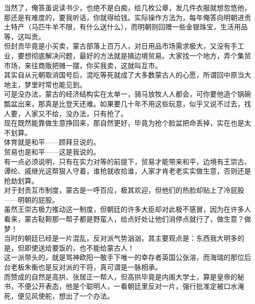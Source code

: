 \begin{multicols}{\theparacolNo}
当然了，俺答虽说读书少，也绝不是白痴，给几枚公章，发几件衣服就想忽悠他，那还是有难度的，要我听话，你就得给钱。实际操作方法为，每年俺答向明朝进贡土特产（马匹牛羊不限，有什么送什么），而明朝则回赠一些金银珠宝，生活用品等，这叫贡。\\

但封贡毕竟是小买卖，蒙古部落上百万人，对日用品市场需求极大，又没有手工业，要想彻底解决问题，最好的方法就是搞边境贸易。大家找一个地方，弄个集贸市场，来往商贩把摊一摆，你买我卖，这就叫互市。\\

其实自从元朝取消国号后，混吃等死就成了大多数蒙古人的心愿，所谓回中原当大地主，梦里时常也能见到。\\

可是没办法，蒙古的经济结构实在太单一，骑马放牧人人都会，可你要他造个锅碗瓢盆出来，那真是比登天还难。如果要几十年不用这些玩意，似乎又说不过去，找人要，人家又不给，没办法，只有抢了。\\

现在既然能靠做生意挣回来，那自然更好，毕竟为抢个脸盆把命丢掉，实在也是太不划算。\\

体育就是和平——顾拜旦说的。\\

贸易也是和平——这是我说的。\\

有一点必须说明，只有在实力对等的前提下，贸易才能带来和平，边境有王崇古、谭纶、戚继光这帮狠人守着，谁抢就收拾谁，人家才肯老老实实做生意，否则还是抢劫划算。\\

对于封贡互市制度，蒙古是一呼百应，极其欢迎，但他们的热脸却贴上了冷屁股——明朝的屁股。\\

虽然王崇古极力推动这一制度，但朝廷的许多大臣却对此极不感冒，因为在许多人看来，蒙古鞑靼那一帮子都是野蛮人，给点好处让他们消停点就行了，做生意？做梦！\\

当时的朝廷已经是一片混乱，反对派气势汹汹，其主要观点是：东西我大明多的是，但即使送给要饭的，也不能给蒙古人！\\

这一派带头的，就是骂神欧阳一敬手下唯一的幸存者英国公张溶，而海瑞的那位后台老板朱衡也是反对派的干将，真可谓是一脉相承。\\

而赞成的自然是高拱、张居正一帮人，但高拱毕竟是内阁大学士，算是皇帝的秘书，不便公开表态，他是个聪明人，一看朝廷里反对一片，强行批准定被口水淹死，便见风使舵，想出了一个办法。\\


\end{multicols}
